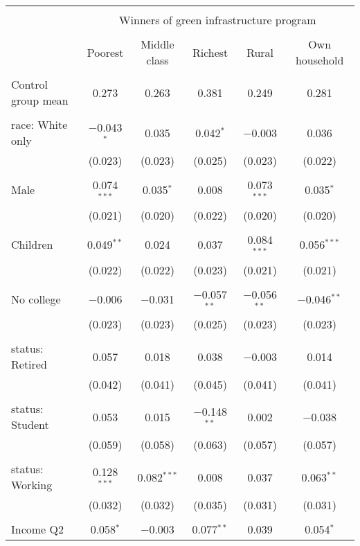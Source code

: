 
\begin{tabular}{@{\extracolsep{5pt}}lccccc} 
\\[-1.8ex]\hline 
\hline \\[-1.8ex] 
 & \multicolumn{5}{c}{Winners of green infrastructure program} \\ 
\cline{2-6} 
\\[-1.8ex] & Poorest & Middle class & Richest & Rural & Own household \\ 
\hline \\[-1.8ex] 
 Control group mean & 0.273 & 0.263 & 0.381 & 0.249 & 0.281  \\ \hline \\[-1.8ex] race: White only & $-$0.043$^{*}$ & 0.035 & 0.042$^{*}$ & $-$0.003 & 0.036 \\ 
  & (0.023) & (0.023) & (0.025) & (0.023) & (0.022) \\ 
  & & & & & \\ 
 Male & 0.074$^{***}$ & 0.035$^{*}$ & 0.008 & 0.073$^{***}$ & 0.035$^{*}$ \\ 
  & (0.021) & (0.020) & (0.022) & (0.020) & (0.020) \\ 
  & & & & & \\ 
 Children & 0.049$^{**}$ & 0.024 & 0.037 & 0.084$^{***}$ & 0.056$^{***}$ \\ 
  & (0.022) & (0.022) & (0.023) & (0.021) & (0.021) \\ 
  & & & & & \\ 
 No college & $-$0.006 & $-$0.031 & $-$0.057$^{**}$ & $-$0.056$^{**}$ & $-$0.046$^{**}$ \\ 
  & (0.023) & (0.023) & (0.025) & (0.023) & (0.023) \\ 
  & & & & & \\ 
 status: Retired & 0.057 & 0.018 & 0.038 & $-$0.003 & 0.014 \\ 
  & (0.042) & (0.041) & (0.045) & (0.041) & (0.041) \\ 
  & & & & & \\ 
 status: Student & 0.053 & 0.015 & $-$0.148$^{**}$ & 0.002 & $-$0.038 \\ 
  & (0.059) & (0.058) & (0.063) & (0.057) & (0.057) \\ 
  & & & & & \\ 
 status: Working & 0.128$^{***}$ & 0.082$^{***}$ & 0.008 & 0.037 & 0.063$^{**}$ \\ 
  & (0.032) & (0.032) & (0.035) & (0.031) & (0.031) \\ 
  & & & & & \\ 
 Income Q2 & 0.058$^{*}$ & $-$0.003 & 0.077$^{**}$ & 0.039 & 0.054$^{*}$ \\ 

\end{tabular}
